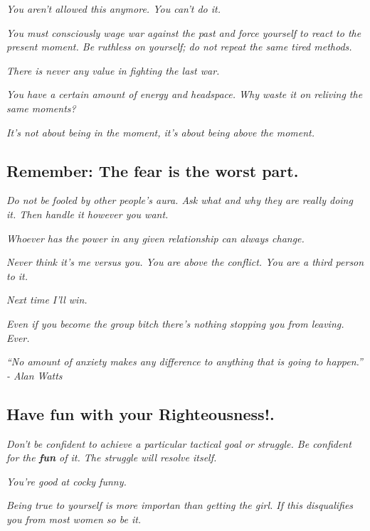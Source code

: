 \documentclass[12pt]{article}
\begin{document}
\textit{You aren't allowed this anymore.  You can't do it.}

\textit{You must consciously wage war against the past and force yourself to react to the present moment. Be ruthless on yourself; do not repeat the same tired methods.}

\textit{There is never any value in fighting the last war.}

\textit{You have a certain amount of energy and headspace.  Why waste it on reliving the same moments?}

\textit{It's not about being in the moment, it's about being above the moment.}
\pagebreak



\subsection*{Remember: The fear is the worst part.}

\textit{Do not be fooled by other people's aura.  Ask what and why they are really doing it.  Then handle it however you want.}

\textit{Whoever has the power in any given relationship can always change.}

\textit{Never think it's me versus you.  You are above the conflict.  You are a third person to it.}

\textit{Next time I'll win.}

\textit{Even if you become the group bitch there's nothing stopping you from leaving.  Ever.}

\textit{“No amount of anxiety makes any difference to anything that is going to happen.” - Alan Watts}

\pagebreak

\subsection*{Have fun with your Righteousness!.}
\textit{Don't be confident to achieve a particular tactical goal or struggle.  Be confident for the \textbf{fun} of it.  The struggle will resolve itself.}

\textit{You're good at cocky funny.}

\textit{Being true to yourself is more importan than getting the girl.  If this disqualifies you from most women so be it.}
\end{document}
